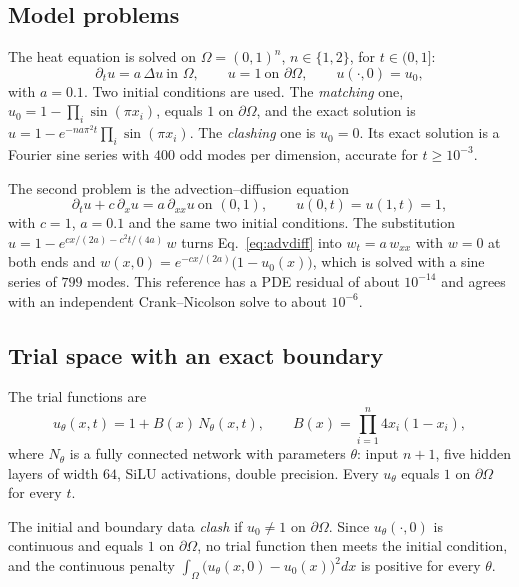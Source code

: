 \documentclass[a4paper,fleqn]{cas-sc}
\begin{document}
\subsection{Model problems}
\label{sec:problems}

The heat equation is solved on $\Omega=(0,1)^n$, $n\in\{1,2\}$, for $t\in(0,1]$:
\begin{equation}
\partial_t u = a\,\Delta u \ \text{in } \Omega, \qquad u = 1 \ \text{on } \partial\Omega, \qquad u(\cdot,0) = u_0,
\label{eq:heat}
\end{equation}
with $a=0.1$. Two initial conditions are used. The \emph{matching} one, $u_0=1-\prod_i\sin(\pi x_i)$, equals $1$ on
$\partial\Omega$, and the exact solution is $u=1-e^{-na\pi^2 t}\prod_i\sin(\pi x_i)$. The \emph{clashing} one is $u_0=0$.
Its exact solution is a Fourier sine series with $400$ odd modes per dimension, accurate for $t\ge10^{-3}$.

The second problem is the advection--diffusion equation
\begin{equation}
\partial_t u + c\,\partial_x u = a\,\partial_{xx} u \ \text{on } (0,1), \qquad u(0,t)=u(1,t)=1,
\label{eq:advdiff}
\end{equation}
with $c=1$, $a=0.1$ and the same two initial conditions. The substitution $u=1-e^{cx/(2a)-c^2t/(4a)}\,w$ turns
Eq.~\eqref{eq:advdiff} into $w_t=a\,w_{xx}$ with $w=0$ at both ends and $w(x,0)=e^{-cx/(2a)}\bigl(1-u_0(x)\bigr)$,
which is solved with a sine series of $799$ modes. This reference has a PDE residual of about $10^{-14}$ and agrees with
an independent Crank--Nicolson solve to about $10^{-6}$.

\subsection{Trial space with an exact boundary}
\label{sec:trial}

The trial functions are
\begin{equation}
u_\theta(x,t) = 1 + B(x)\,N_\theta(x,t), \qquad B(x) = \prod_{i=1}^n 4x_i(1-x_i),
\label{eq:trial}
\end{equation}
where $N_\theta$ is a fully connected network with parameters $\theta$: input $n+1$, five hidden layers of width $64$,
SiLU activations, double precision. Every $u_\theta$ equals $1$ on $\partial\Omega$ for every $t$.

\begin{definition}[Clash]
The initial and boundary data \emph{clash} if $u_0\neq1$ on $\partial\Omega$. Since $u_\theta(\cdot,0)$ is continuous and
equals $1$ on $\partial\Omega$, no trial function then meets the initial condition, and the continuous penalty
$\int_\Omega\bigl(u_\theta(x,0)-u_0(x)\bigr)^2dx$ is positive for every $\theta$.
\end{definition}
\end{document}

